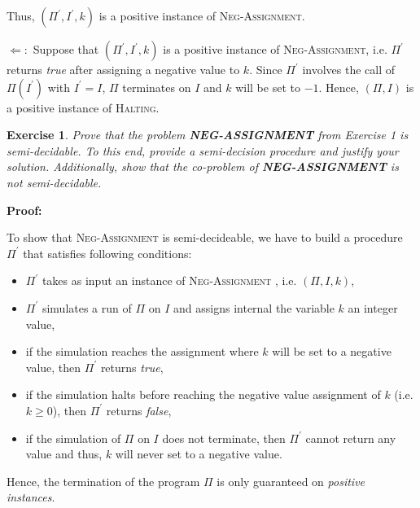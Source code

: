 \documentclass[11pt]{article}
\newtheorem{exercise}[theorem]{Exercise}
\begin{document}
Thus, $(\Pi ^{\prime },I^{\prime },k)$ is a positive instance of \textsc{%
Neg-Assignment}.

\bigskip

$\Leftarrow :$ Suppose that $\left( \Pi ^{\prime },I^{\prime },k\right) $ is
a positive instance of \textsc{Neg-Assignment}, i.e. $\Pi ^{\prime }$
returns \textit{true} after assigning a negative value to $k$. Since $\Pi
^{\prime }$ involves the call of $\Pi (I^{\prime })$ with $I^{\prime }=I$, $%
\Pi $ terminates on $I$ and $k$ will be set to $-1$. Hence, $(\Pi ,I)$ is a
positive instance of \textsc{Halting}.

\bigskip

\begin{exercise}
Prove that the problem \textbf{NEG-ASSIGNMENT} from Exercise 1 is
semi-decidable. To this end, provide a semi-decision procedure and justify
your solution. Additionally, show that the co-problem of \textbf{%
NEG-ASSIGNMENT} is not semi-decidable.
\end{exercise}

\textbf{Proof:}

To show that \textsc{Neg-Assignment} is semi-decideable, we have to build a
procedure $\Pi ^{\prime }$ that satisfies following conditions:

\begin{itemize}
\item $\Pi ^{\prime }$ takes as input an instance of \textsc{Neg-Assignment}%
, i.e. $\left( \Pi ,I,k\right) $,

\item $\Pi ^{\prime }$ simulates a run of $\Pi $ on $I$ and assigns internal
the variable $k$ an integer value,

\item if the simulation reaches the assignment where $k$ will be set to a
negative value, then $\Pi ^{\prime }$ returns \textit{true},

\item if the simulation halts before reaching the negative value assignment
of $k$ (i.e. $k\geq 0$), then $\Pi ^{\prime }$ returns \textit{false},

\item if the simulation of $\Pi $ on $I$ does not terminate, then $\Pi
^{\prime }$ cannot return any value and thus, $k$ will never set to a
negative value.
\end{itemize}

\bigskip Hence, the termination of the program $\Pi $ is only guaranteed on 
\textit{positive instances}.
\end{document}
